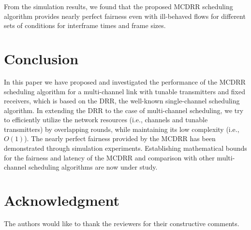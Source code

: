 \documentclass[conference,letterpaper]{IEEEtran}
\begin{document}
From the simulation results, we found that the proposed MCDRR scheduling
algorithm provides nearly perfect fairness even with ill-behaved flows for
different sets of conditions for interframe times and frame sizes.

\section{Conclusion}
In this paper we have proposed and investigated the performance of the MCDRR
scheduling algorithm for a multi-channel link with tunable transmitters and
fixed receivers, which is based on the DRR, the well-known single-channel
scheduling algorithm. In extending the DRR to the case of multi-channel
scheduling, we try to efficiently utilize the network resources (i.e., channels
and tunable transmitters) by overlapping rounds, while maintaining its low
complexity (i.e., $O(1)$). The nearly perfect fairness provided by the MCDRR has
been demonstrated through simulation experiments. Establishing mathematical
bounds for the fairness and latency of the MCDRR and comparison with other
multi-channel scheduling algorithms are now under study.

\section{Acknowledgment}
The authors would like to thank the reviewers for their constructive comments.
\end{document}
